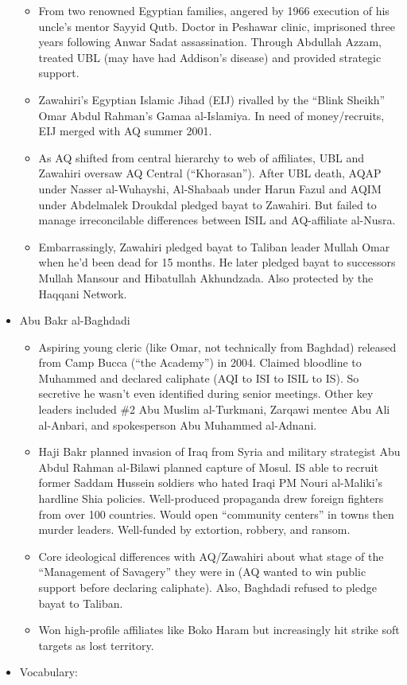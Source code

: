 \documentclass[
]{article}
\begin{document}
\begin{itemize}
  \begin{itemize}
  \item
    From two renowned Egyptian families, angered by 1966 execution of
    his uncle's mentor Sayyid Qutb. Doctor in Peshawar clinic,
    imprisoned three years following Anwar Sadat assassination. Through
    Abdullah Azzam, treated UBL (may have had Addison's disease) and
    provided strategic support.
  \item
    Zawahiri's Egyptian Islamic Jihad (EIJ) rivalled by the ``Blink
    Sheikh'' Omar Abdul Rahman's Gamaa al-Islamiya. In need of
    money/recruits, EIJ merged with AQ summer 2001.
  \item
    As AQ shifted from central hierarchy to web of affiliates, UBL and
    Zawahiri oversaw AQ Central (``Khorasan''). After UBL death, AQAP
    under Nasser al-Wuhayshi, Al-Shabaab under Harun Fazul and AQIM
    under Abdelmalek Droukdal pledged bayat to Zawahiri. But failed to
    manage irreconcilable differences between ISIL and AQ-affiliate
    al-Nusra.
  \item
    Embarrassingly, Zawahiri pledged bayat to Taliban leader Mullah Omar
    when he'd been dead for 15 months. He later pledged bayat to
    successors Mullah Mansour and Hibatullah Akhundzada. Also protected
    by the Haqqani Network.
  \end{itemize}
\item
  Abu Bakr al-Baghdadi

  \begin{itemize}
  \item
    Aspiring young cleric (like Omar, not technically from Baghdad)
    released from Camp Bucca (``the Academy'') in 2004. Claimed
    bloodline to Muhammed and declared caliphate (AQI to ISI to ISIL to
    IS). So secretive he wasn't even identified during senior meetings.
    Other key leaders included \#2 Abu Muslim al-Turkmani, Zarqawi
    mentee Abu Ali al-Anbari, and spokesperson Abu Muhammed al-Adnani.
  \item
    Haji Bakr planned invasion of Iraq from Syria and military
    strategist Abu Abdul Rahman al-Bilawi planned capture of Mosul. IS
    able to recruit former Saddam Hussein soldiers who hated Iraqi PM
    Nouri al-Maliki's hardline Shia policies. Well-produced propaganda
    drew foreign fighters from over 100 countries. Would open
    ``community centers'' in towns then murder leaders. Well-funded by
    extortion, robbery, and ransom.
  \item
    Core ideological differences with AQ/Zawahiri about what stage of
    the ``Management of Savagery'' they were in (AQ wanted to win public
    support before declaring caliphate). Also, Baghdadi refused to
    pledge bayat to Taliban.
  \item
    Won high-profile affiliates like Boko Haram but increasingly hit
    strike soft targets as lost territory.
  \end{itemize}
\item
  Vocabulary:


\end{itemize}
\end{document}
